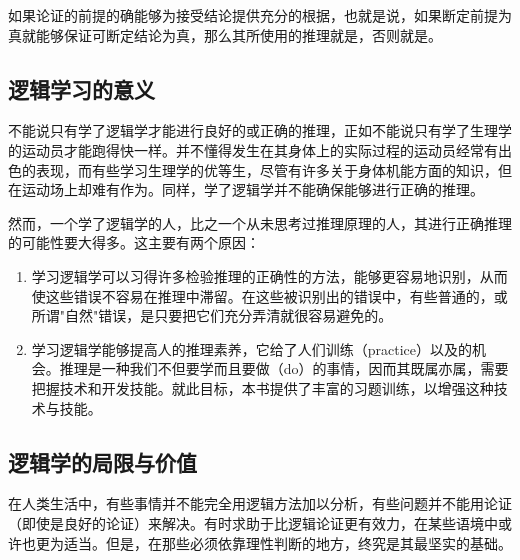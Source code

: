 如果论证的前提的确能够为接受结论提供充分的根据，也就是说，如果断定前提为真就能够保证可断定结论为真，那么其所使用的推理就是，否则就是。

\subsection{逻辑学习的意义}

不能说只有学了逻辑学才能进行良好的或正确的推理，正如不能说只有学了生理学的运动员才能跑得快一样。并不懂得发生在其身体上的实际过程的运动员经常有出色的表现，而有些学习生理学的优等生，尽管有许多关于身体机能方面的知识，但在运动场上却难有作为。同样，学了逻辑学并不能确保能够进行正确的推理。

然而，一个学了逻辑学的人，比之一个从未思考过推理原理的人，其进行正确推理的可能性要大得多。这主要有两个原因：

\begin{enumerate}
  \item 学习逻辑学可以习得许多检验推理的正确性的方法，能够更容易地识别，从而使这些错误不容易在推理中滞留。在这些被识别出的错误中，有些普通的，或所谓"自然"错误，是只要把它们充分弄清就很容易避免的。

  \item 学习逻辑学能够提高人的推理素养，它给了人们训练（practice）以及的机会。推理是一种我们不但要学而且要做（do）的事情，因而其既属亦属，需要把握技术和开发技能。就此目标，本书提供了丰富的习题训练，以增强这种技术与技能。
\end{enumerate}

\subsection{逻辑学的局限与价值}

在人类生活中，有些事情并不能完全用逻辑方法加以分析，有些问题并不能用论证（即使是良好的论证）来解决。有时求助于比逻辑论证更有效力，在某些语境中或许也更为适当。但是，在那些必须依靠理性判断的地方，终究是其最坚实的基础。

